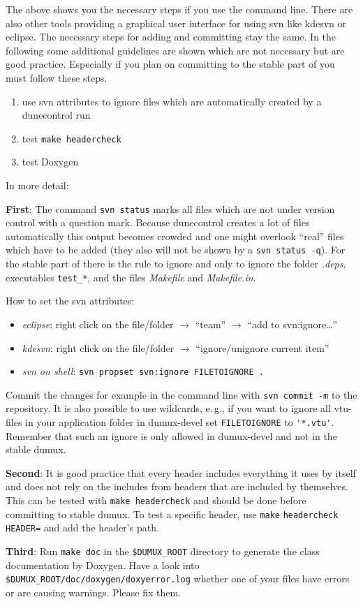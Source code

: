 The above shows you the necessary steps if you use the command line. There are also other tools providing a graphical 
user interface for using svn like kdesvn or eclipse. The necessary steps for adding and committing stay the same.
In the following some additional guidelines are shown which are not necessary but are good practice.
Especially if you plan on committing to the stable part of \Dumux you must follow these steps.

\begin{enumerate}[1)]
 \item use svn attributes to ignore files which are automatically created by a dunecontrol run
 \item test \texttt{make headercheck}
 \item test Doxygen
\end{enumerate}

\noindent In more detail:

\textbf{First}: The command \verb+svn status+ marks all files which are not under version control with a question mark. Because dunecontrol creates a lot of files automatically this output becomes crowded and one might overlook ``real'' files which have to be added (they also will not be shown by a \verb+svn status -q+).
For the stable part of \Dumux there is the rule to ignore and only to ignore the folder {\em .deps}, executables \texttt{test\_*}, and the files {\em Makefile} and {\em Makefile.in}.

How to set the svn attributes:
\begin{itemize}
 \item{\em eclipse}: right click on the file/folder $\rightarrow$ ``team'' $\rightarrow$ ``add to svn:ignore\dots''
 \item{\em kdesvn}: right click on the file/folder $\rightarrow$ ``ignore/unignore current item''
 \item{\em svn on shell}: \verb+svn propset svn:ignore FILETOIGNORE .+
\end{itemize}
Commit the changes for example in the command line with \verb+svn commit -m+ to the repository. It is also possible to use wildcards, e.\,g., if you want to ignore all vtu-files in your application folder in dumux-devel set \verb+FILETOIGNORE+ to \verb+'*.vtu'+. Remember that such an ignore is only allowed in dumux-devel and not in the stable dumux.

\textbf{Second}: It is good practice that every header includes everything it uses by itself and does not rely on the includes from headers that are included by themselves. This can be tested with \texttt{make headercheck} and should be done before committing to stable dumux. To test a specific header, use \texttt{make} \texttt{headercheck} \texttt{HEADER=} and add the header's path.

\textbf{Third}: Run \texttt{make doc} in the \texttt{\$DUMUX\_ROOT} directory to generate the class documentation by Doxygen. Have a look into \texttt{\$DUMUX\_ROOT/doc/doxygen/doxyerror.log} whether one of your files have errors or are causing warnings. Please fix them.
